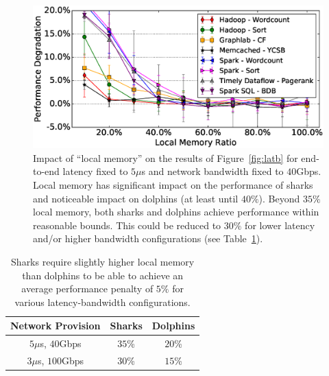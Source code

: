 %
\begin{figure}
  \centering
    \includegraphics[width=\columnwidth]{img/vary_remote_mem.eps} 
  \caption{\small{Impact of ``local memory'' on the results of Figure~\ref{fig:latb} for end-to-end latency fixed to $5\mu$s and network bandwidth fixed to $40$Gbps. Local memory has significant impact on the performance of sharks and noticeable impact on dolphins (at least until $40\%$). Beyond $35\%$ local memory, both sharks and dolphins achieve performance within reasonable bounds. This could be reduced to $30\%$ for lower latency and/or higher bandwidth configurations (see Table~\ref{tab:rmem}).}}
  \label{fig:impb}
\end{figure}
%
\begin{table}[t]
    \centering
    \small
    \begin{tabular}{c|c|c}
    \textbf{Network Provision} & \textbf{Sharks} & \textbf{Dolphins}\\
    \hline\hline
    $5\mu$s, $40$Gbps & $35$\% & $20$\%\\\hline
    $3\mu$s, $100$Gbps & $30$\% & $15$\%\\\hline\hline
    \end{tabular}
    \caption{Sharks require slightly higher local memory than dolphins to be able to achieve an average performance penalty of $5\%$ for various latency-bandwidth configurations.}
    \label{tab:rmem}
\end{table}

